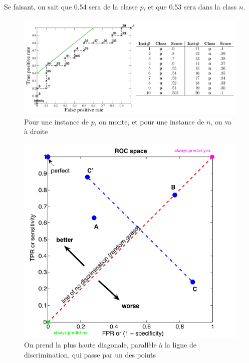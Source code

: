 \documentclass[letterpaper, 12pt]{article}
\begin{document}
					Se faisant, on sait que 0.54 sera de la classe $p$, et que
					0.53 sera dans la class $n$.					
				\begin{figure}[H]
					\centering
					\includegraphics[scale=0.5]{Images/ROC2.png}
					\caption{Pour une instance de $p$, on monte,
							 et pour une instance de $n$, on va à droite}
					\label{fig:roc1}
				\end{figure}\noindent
				\begin{minipage}{0.45\textwidth}
					\vspace*{2cm}
					\begin{figure}[H]
						\centering
						\includegraphics[scale=0.5]{Images/ROC.png}
						\caption{On prend la plus haute diagonale,
								 parallèle à la
								 ligne de discrimination, qui passe
								 par un des points}
						\label{fig:roc2}
					\end{figure}\noindent
				\end{minipage}\hfill
\end{document}
